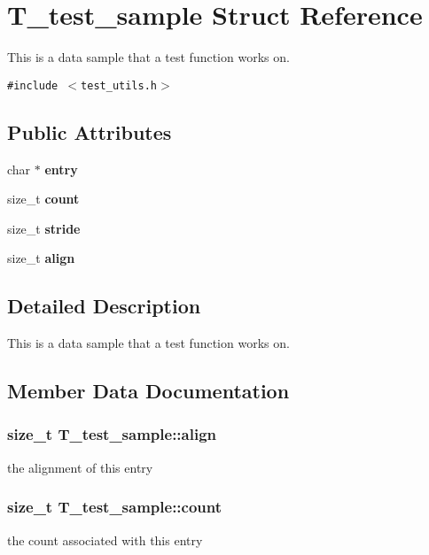\section{T\_\-test\_\-sample Struct Reference}
\label{structT__test__sample}
This is a data sample that a test function works on. 


{\tt \#include $<$test\_\-utils.h$>$}

\subsection*{Public Attributes}
\begin{CompactItemize}
\item 
char $\ast$ {\bf entry}
\item 
size\_\-t {\bf count}
\item 
size\_\-t {\bf stride}
\item 
size\_\-t {\bf align}
\end{CompactItemize}


\subsection{Detailed Description}
This is a data sample that a test function works on.



\subsection{Member Data Documentation}
\subsubsection{\setlength{\rightskip}{0pt plus 5cm}size\_\-t T\_\-test\_\-sample::align}\label{structT__test__sample_m3}


the alignment of this entry 
\subsubsection{\setlength{\rightskip}{0pt plus 5cm}size\_\-t T\_\-test\_\-sample::count}\label{structT__test__sample_m1}


the count associated with this entry 
